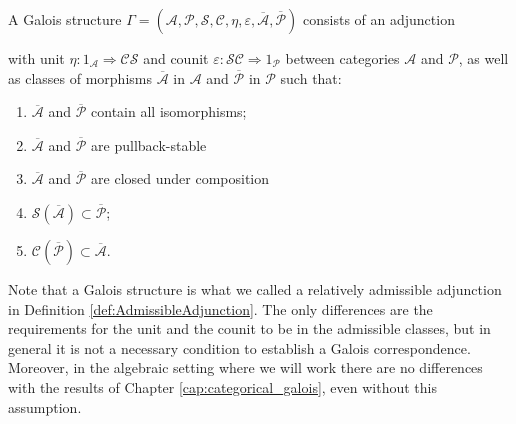 \begin{definition}
\label{def:GaloisStructure}
    A Galois structure $\Gamma = (\mathcal{A}, \mathcal{P}, \mathcal{S}, \mathcal{C}, \eta, \varepsilon, \overline{\mathcal{A}}, \overline{\mathcal{P}})$ consists of an adjunction
    \begin{center}
    \end{center}
    with unit $\eta:1_{\mathcal{A}}\Rightarrow \mathcal{C}\mathcal{S}$ and counit $\varepsilon:\mathcal{S}\mathcal{C}\Rightarrow1_{\mathcal{P}}$ between categories $\mathcal{A}$ and $\mathcal{P}$, as well as classes of morphisms $\overline{\mathcal{A}}$ in $\mathcal{A}$ and $\overline{\mathcal{P}}$ in $\mathcal{P}$ such that:
    \begin{enumerate}
        \item $\overline{\mathcal{A}}$ and $\overline{\mathcal{P}}$ contain all isomorphisms;
        \item $\overline{\mathcal{A}}$ and $\overline{\mathcal{P}}$ are pullback-stable
        \item $\overline{\mathcal{A}}$ and $\overline{\mathcal{P}}$ are closed under composition
        \item $\mathcal{S}(\overline{\mathcal{A}})\subset \overline{\mathcal{P}}$;
        \item $\mathcal{C}(\overline{\mathcal{P}})\subset \overline{\mathcal{A}}$.
    \end{enumerate}
\end{definition}
\begin{oss*}
    Note that a Galois structure is what we called a relatively admissible adjunction in Definition \ref{def:AdmissibleAdjunction}. The only differences are the requirements for the unit and the counit to be in the admissible classes, but in general it is not a necessary condition to establish a Galois correspondence. Moreover, in the algebraic setting where we will work there are no differences with the results of Chapter \ref{cap:categorical_galois}, even without this assumption.
\end{oss*}

